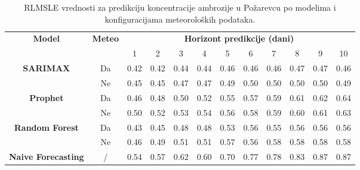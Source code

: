 \documentclass[12pt]{article}
\begin{document}
\begin{table}[h!]
\centering
\caption{RLMSLE vrednosti za predikciju koncentracije ambrozije u Požarevcu po modelima i konfiguracijama meteoroloških podataka.}
\label{tab:rlmsle_ambrozija}

\begin{tabular}{|c|c|*{10}{c|}}
\hline
\multirow{2}{*}{\textbf{Model}} & \multirow{2}{*}{\textbf{Meteo}} 
& \multicolumn{10}{c|}{\textbf{Horizont predikcije (dani)}} \\ \cline{3-12}
& & 1 & 2 & 3 & 4 & 5 & 6 & 7 & 8 & 9 & 10 \\ \hline
\multirow{2}{*}{\centering \textbf{SARIMAX}} & Da & 0.42 & 0.42 & 0.44 & 0.44 & 0.46 & 0.46 & 0.46 & 0.47 & 0.47 & 0.46 \\ \cline{2-12}
 & Ne & 0.45 & 0.45 & 0.47 & 0.47 & 0.49 & 0.50 & 0.50 & 0.50 & 0.50 & 0.49 \\ \hline
\multirow{2}{*}{\centering \textbf{Prophet}} & Da & 0.46 & 0.48 & 0.50 & 0.52 & 0.55 & 0.57 & 0.59 & 0.61 & 0.62 & 0.64 \\ \cline{2-12}
 & Ne & 0.50 & 0.52 & 0.53 & 0.54 & 0.56 & 0.58 & 0.59 & 0.60 & 0.61 & 0.63 \\ \hline
\multirow{2}{*}{\centering \textbf{Random Forest}} & Da & 0.43 & 0.45 & 0.48 & 0.48 & 0.53 & 0.56 & 0.55 & 0.56 & 0.56 & 0.56 \\ \cline{2-12}
 & Ne & 0.46 & 0.49 & 0.51 & 0.51 & 0.57 & 0.56 & 0.58 & 0.58 & 0.58  & 0.58 \\ \hline
\multirow{1}{*}{\centering \textbf{Naive Forecasting}} & / & 0.54 & 0.57 & 0.62 & 0.60 & 0.70 & 0.77 & 0.78 & 0.83 & 0.87 &  0.87 \\ \hline
\end{tabular}%

\end{table}
\end{document}
